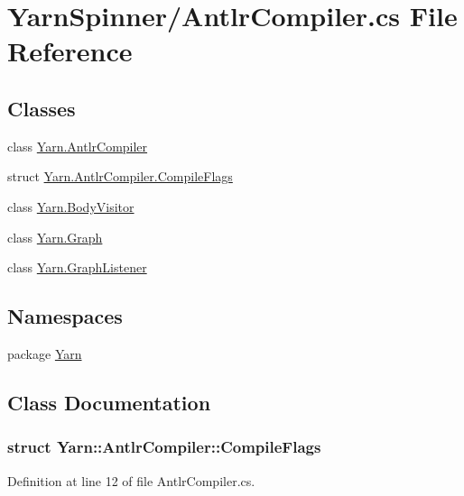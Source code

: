 \hypertarget{a00294}{\section{Yarn\-Spinner/\-Antlr\-Compiler.cs File Reference}
\label{a00294}
}
\subsection*{Classes}
\begin{DoxyCompactItemize}
\item 
class \hyperlink{a00032}{Yarn.\-Antlr\-Compiler}
\item 
struct \hyperlink{a00032_a00362}{Yarn.\-Antlr\-Compiler.\-Compile\-Flags}
\item 
class \hyperlink{a00038}{Yarn.\-Body\-Visitor}
\item 
class \hyperlink{a00102}{Yarn.\-Graph}
\item 
class \hyperlink{a00103}{Yarn.\-Graph\-Listener}
\end{DoxyCompactItemize}
\subsection*{Namespaces}
\begin{DoxyCompactItemize}
\item 
package \hyperlink{a00045}{Yarn}
\end{DoxyCompactItemize}


\subsection{Class Documentation}
\label{a00362}
\hypertarget{a00032_a00362}{}
\subsubsection{struct Yarn\-:\-:Antlr\-Compiler\-:\-:Compile\-Flags}


Definition at line 12 of file Antlr\-Compiler.\-cs.



